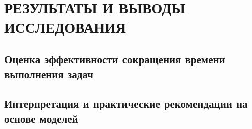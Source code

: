 \section{РЕЗУЛЬТАТЫ И ВЫВОДЫ ИССЛЕДОВАНИЯ}
\subsection{Оценка эффективности сокращения времени выполнения задач}
\subsection{Интерпретация и практические рекомендации на основе моделей}


        
\clearpage